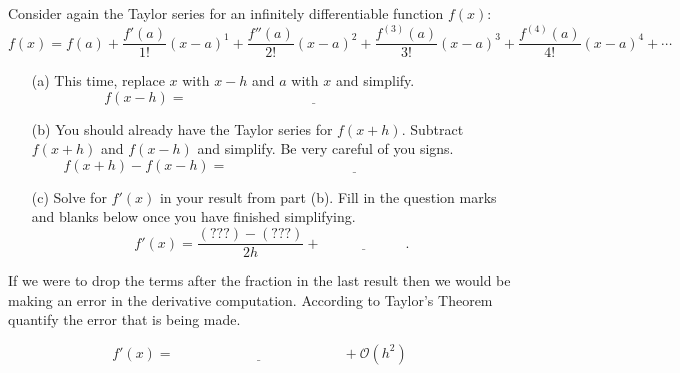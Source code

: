 \begin{problem}\label{prob:numdiff3}
    Consider again the Taylor series for an infinitely differentiable function $f(x)$:
    \[ f(x) = f(a) + \frac{f'(a)}{1!} (x-a)^1 + \frac{f''(a)}{2!}(x-a)^2 +
        \frac{f^{(3)}(a)}{3!}(x-a)^3 + \frac{f^{(4)}(a)}{4!}(x-a)^4 + \cdots \] 
    \begin{enumerate}
        \item[(a)] This time, replace $x$ with $x-h$ and $a$ with $x$ and simplify.  
            \[ f(x-h) = \underline{\hspace{3in}} \]
        \item[(b)] You should already have the Taylor series for $f(x+h)$.  Subtract
            $f(x+h)$ and $f(x-h)$ and simplify.  Be very careful of you signs.  
            \[ f(x+h) - f(x-h) = \underline{\hspace{3in}} \]
        \item[(c)] Solve for $f'(x)$ in your result from part (b).  Fill in the question
            marks and blanks below once you have finished simplifying.
            \[ f'(x) = \frac{(???) - (???)}{2h} + \underline{\hspace{1in}}. \]
    \end{enumerate}
\end{problem}

\begin{problem}
    If we were to drop the terms after the fraction in the last result then we would be
    making an error in the derivative computation.  According to Taylor's Theorem quantify
    the error that is being made.
\end{problem}

\begin{thm}
    \[ f'(x) = \underline{\hspace{2in}} + \mathcal{O}(h^2) \]
\end{thm}


